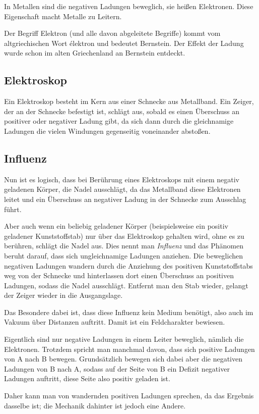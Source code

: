In Metallen sind die negativen Ladungen beweglich, sie heißen Elektronen. Diese Eigenschaft macht Metalle zu \glqq Leitern\grqq .

\begin{NiceToKnow}
Der Begriff Elektron (und alle davon abgeleitete Begriffe) kommt vom altgriechischen Wort \glqq élektron\grqq{} und bedeutet \glqq Bernstein\grqq . Der Effekt der Ladung wurde schon im alten Griechenland an Bernstein entdeckt.
\end{NiceToKnow}


\subsection{Elektroskop}

Ein Elektroskop besteht im Kern aus einer Schnecke aus Metallband. Ein Zeiger, der an der Schnecke befestigt ist, schlägt aus, sobald es einen Überschuss an positiver oder negativer Ladung gibt, da sich dann durch die gleichnamige Ladungen die vielen Windungen gegenseitig voneinander abstoßen.


\subsection{Influenz} \label{subsec:Influenz}

Nun ist es logisch, dass bei Berührung eines Elektroskops mit einem negativ geladenen Körper, die Nadel ausschlägt, da das Metallband diese Elektronen leitet und ein Überschuss an negativer Ladung in der Schnecke zum Ausschlag führt.

Aber auch wenn ein beliebig geladener Körper (beispielsweise ein positiv geladener Kunststoffstab) nur über das Elektroskop gehalten wird, ohne es zu berühren, schlägt die Nadel aus. Dies nennt man \emph{Influenz} und das Phänomen beruht darauf, dass sich ungleichnamige Ladungen anziehen. Die beweglichen negativen Ladungen wandern durch die Anziehung des positiven Kunststoffstabs weg von der Schnecke und hinterlassen dort einen Überschuss an positiven Ladungen, sodass die Nadel ausschlägt. Entfernt man den Stab wieder, gelangt der Zeiger wieder in die Ausgangslage.

Das Besondere dabei ist, dass diese Influenz kein Medium benötigt, also auch im Vakuum über Distanzen auftritt. Damit ist ein Feldcharakter bewiesen.

\begin{Anmerkung}
Eigentlich sind nur negative Ladungen in einem Leiter beweglich, nämlich die Elektronen. Trotzdem spricht man manchmal davon, dass sich positive Ladungen von A nach B bewegen. Grundsätzlich bewegen sich dabei aber die negativen Ladungen von B nach A, sodass auf der Seite von B ein Defizit negativer Ladungen auftritt, diese Seite also positiv geladen ist.

Daher kann man von wandernden positiven Ladungen sprechen, da das Ergebnis dasselbe ist; die Mechanik dahinter ist jedoch eine Andere.
\end{Anmerkung}